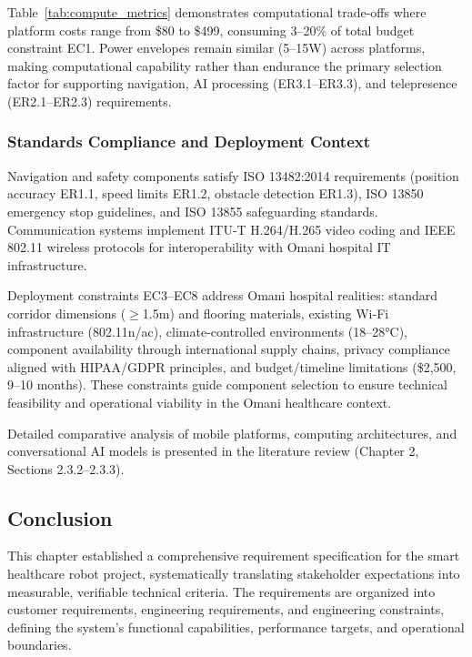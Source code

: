 Table~\ref{tab:compute_metrics} demonstrates computational trade-offs where platform costs range from \$80 to \$499, consuming 3--20\% of total budget constraint EC1. Power envelopes remain similar (5--15W) across platforms, making computational capability rather than endurance the primary selection factor for supporting navigation, AI processing (ER3.1--ER3.3), and telepresence (ER2.1--ER2.3) requirements.

\subsubsection{Standards Compliance and Deployment Context}

Navigation and safety components satisfy ISO 13482:2014 \cite{iso13482:2014} requirements (position accuracy ER1.1, speed limits ER1.2, obstacle detection ER1.3), ISO 13850 \cite{iso13850} emergency stop guidelines, and ISO 13855 \cite{iso13855} safeguarding standards. Communication systems implement ITU-T H.264/H.265 \cite{itut_h264_h265} video coding and IEEE 802.11 \cite{ieee802.11} wireless protocols for interoperability with Omani hospital IT infrastructure.

Deployment constraints EC3--EC8 address Omani hospital realities: standard corridor dimensions ($\geq$1.5m) and flooring materials, existing Wi-Fi infrastructure (802.11n/ac), climate-controlled environments (18--28°C), component availability through international supply chains, privacy compliance aligned with HIPAA/GDPR principles, and budget/timeline limitations (\$2,500, 9--10 months). These constraints guide component selection to ensure technical feasibility and operational viability in the Omani healthcare context.

Detailed comparative analysis of mobile platforms, computing architectures, and conversational AI models is presented in the literature review (Chapter 2, Sections 2.3.2--2.3.3).

\subsection{Conclusion}

This chapter established a comprehensive requirement specification for the smart healthcare robot project, systematically translating stakeholder expectations into measurable, verifiable technical criteria. The requirements are organized into customer requirements, engineering requirements, and engineering constraints, defining the system's functional capabilities, performance targets, and operational boundaries.

